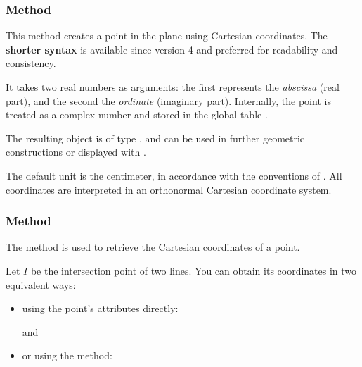 \subsubsection{Method }
\label{ssub:method_point_new}

This method creates a point in the plane using Cartesian coordinates. The \textbf{shorter syntax}  is available since version 4 and preferred for readability and consistency.

\medskip
\noindent
It takes two real numbers as arguments: the first represents the \emph{abscissa} (real part), and the second the \emph{ordinate} (imaginary part). Internally, the point is treated as a complex number and stored in the global table .

\medskip
\noindent
The resulting object is of type , and can be used in further geometric constructions or displayed with .

\medskip
\noindent
{} The default unit is the centimeter, in accordance with the conventions of . All coordinates are interpreted in an orthonormal Cartesian coordinate system.

\vspace{1em}

\begin{tkzexample}[latex = 7cm]
\end{tkzexample}

\subsubsection{Method }
\label{ssub:method_point_get}

The  method is used to retrieve the Cartesian coordinates of a point.

\medskip
\noindent
Let $I$ be the intersection point of two lines. You can obtain its coordinates in two equivalent ways:
\begin{itemize}
  \item using the point’s attributes directly:
    \begin{center}
     \quad and \quad {}
    \end{center}
  \item or using the  method:
    \begin{center}
    \end{center}
\end{itemize}

